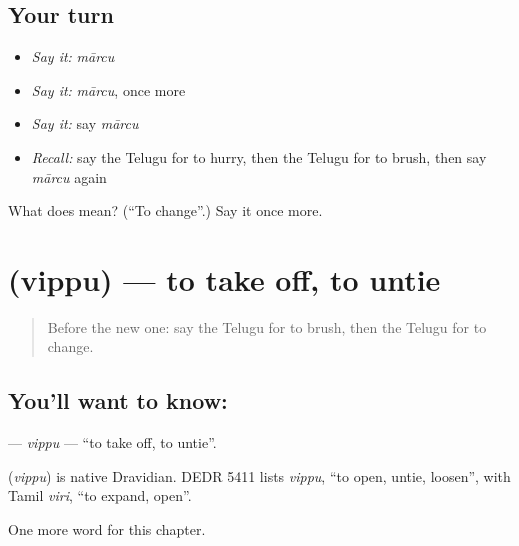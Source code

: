 \subsection*{Your turn}
\begin{itemize}
\raggedright
  \item \emph{Say it:} \emph{mārcu}
  \item \emph{Say it:} \emph{mārcu}, once more
  \item \emph{Say it:} say \emph{mārcu}
  \item \emph{Recall:} say the Telugu for to hurry, then the Telugu for to brush, then say \emph{mārcu} again
\end{itemize}

\begin{tcolorbox}[breakable,colback=teal!4,colframe=teal!35!black,title={Before you move on}]
What does  mean? (\textquotedblleft{}To change\textquotedblright{}.) Say it once more.
\end{tcolorbox}
\section[\texorpdfstring{\te{విప్పు} (vippu)}{విప్పు (vippu)}]{ (vippu) — to take off, to untie}

\label{lesson:TE-C158-vippu}



\begin{quote}
Before the new one: say the Telugu for to brush, then the Telugu for to change.
\end{quote}

\subsection*{You'll want to know: }
\textbf{} — \emph{vippu} — \textquotedblleft{}to take off, to untie\textquotedblright{}.

\begin{cousinweb}
\textbf{} (\emph{vippu}) is native Dravidian. DEDR 5411 lists \emph{vippu}, \textquotedblleft{}to open, untie, loosen\textquotedblright{}, with Tamil \emph{viri}, \textquotedblleft{}to expand, open\textquotedblright{}.
\end{cousinweb}

\begin{grammarlens}[title={What you've built}]
One more word for this chapter.
\end{grammarlens}

